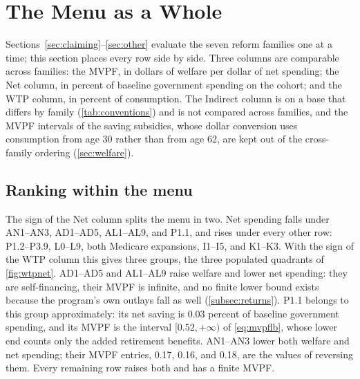 \section{The Menu as a Whole}\label{sec:menu}

Sections~\ref{sec:claiming}--\ref{sec:other} evaluate the seven reform families one at a time; this section places every row side by side. Three columns are comparable across families: the MVPF, in dollars of welfare per dollar of net spending; the Net column, in percent of baseline government spending on the cohort; and the WTP column, in percent of consumption. The Indirect column is on a base that differs by family (\autoref{tab:conventions}) and is not compared across families, and the MVPF intervals of the saving subsidies, whose dollar conversion uses consumption from age 30 rather than from age 62, are kept out of the cross-family ordering (\autoref{sec:welfare}). %

\subsection{Ranking within the menu}\label{subsec:ranking}

The sign of the Net column splits the menu in two. Net spending falls under AN1--AN3, AD1--AD5, AL1--AL9, and P1.1, and rises under every other row: P1.2--P3.9, L0--L9, both Medicare expansions, I1--I5, and K1--K3. %
With the sign of the WTP column this gives three groups, the three populated quadrants of \autoref{fig:wtpnet}. AD1--AD5 and AL1--AL9 raise welfare and lower net spending: they are self-financing, their MVPF is infinite, and no finite lower bound exists because the program's own outlays fall as well (\autoref{subsec:returns}). P1.1 belongs to this group approximately: its net saving is 0.03 percent of baseline government spending, and its MVPF is the interval $[0.52,+\infty)$ of \eqref{eq:mvpflb}, whose lower end counts only the added retirement benefits. %
AN1--AN3 lower both welfare and net spending; their MVPF entries, 0.17, 0.16, and 0.18, are the values of reversing them. %
Every remaining row raises both and has a finite MVPF.

